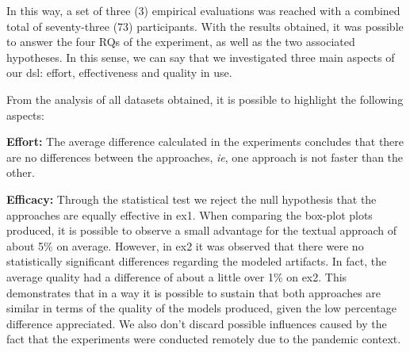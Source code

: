 In this way, a set of three (3) empirical evaluations was reached with a combined total of seventy-three (73) participants.
With the results obtained, it was possible to answer the four RQs of the experiment, as well as the two associated hypotheses.
In this sense, we can say that we investigated three main aspects of our \ac{dsl}: effort, effectiveness and quality in use.

From the analysis of all datasets obtained, it is possible to highlight the following aspects:

\item \textbf{Effort:} The average difference calculated in the experiments concludes that there are no differences between the approaches, \textit{ie}, one approach is not faster than the other.

\item \textbf{Efficacy:} Through the statistical test we reject the null hypothesis that the approaches are equally effective in \ac{ex1}.
When comparing the box-plot plots produced, it is possible to observe a small advantage for the textual approach of about 5\% on average.
However, in \ac{ex2} it was observed that there were no statistically significant differences regarding the modeled artifacts.
In fact, the average quality had a difference of about a little over 1\% on \ac{ex2}.
This demonstrates that in a way it is possible to sustain that both approaches are similar in terms of the quality of the models produced, given the low percentage difference appreciated.
We also don’t discard possible influences caused by the fact that the experiments were conducted remotely due to the pandemic context.

